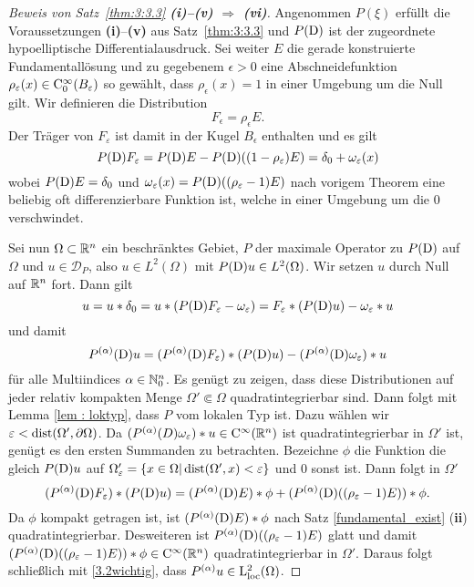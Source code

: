 \begin{proof}[Beweis von Satz~\ref{thm:3:3.3} {\bf (i)--(v) $\Longrightarrow$ (vi)}]
Angenommen $P(\xi)$ erfüllt die Voraussetzungen {\bf (i)}--{\bf(v)} aus Satz~\ref{thm:3:3.3} und $P(\mathrm D)$ ist der zugeordnete hypoelliptische Differentialausdruck. 
Sei weiter $E$ die gerade konstruierte Fundamentallösung und zu gegebenem $\epsilon>0$ eine Abschneidefunktion  $\rho_\varepsilon(x)\in \mathrm C_0^\infty(B_\varepsilon)$ so gewählt, dass $\rho_\epsilon(x)=1$ in einer Umgebung um die Null gilt. Wir definieren die Distribution
\begin{equation}
F_\epsilon= \rho_\epsilon E.
\end{equation}
Der Träger von $F_\varepsilon$ ist damit in der Kugel $B_{\epsilon}$ enthalten und es gilt
\begin{equation}
P(\mathrm D) F_\varepsilon= P(\mathrm D) E - P(\mathrm D)((1-\rho_\varepsilon)E) =\delta_0 + \omega_\varepsilon(x)
\end{equation}  
wobei $P(\mathrm D)E=\delta_0$ und $\omega_\varepsilon(x)= P(\mathrm D)((\rho_\varepsilon-1)E)$ nach vorigem Theorem eine beliebig oft differenzierbare Funktion ist, welche in einer Umgebung um die $0$ verschwindet.  

Sei nun $\Omega\subset\mathbb R^n$ ein beschränktes Gebiet, $P$ der maximale Operator zu $P(\mathrm D)$ auf $\Omega$ und $u\in \mathcal D_{P}$, also 
$u\in L^2(\Omega)$ mit $P(\mathrm D)u\in L^2(\Omega)$. Wir setzen $u$ durch Null auf $\mathbb R^n$ fort. Dann gilt 
\begin{equation}\label{3.2wichtig1}
u= u*\delta_0 = u * (P(\mathrm D) F_\varepsilon-\omega_\varepsilon) = F_\varepsilon*(P(\mathrm D)u)- \omega_\varepsilon *u
\end{equation}
und damit
\begin{equation}\label{3.2wichtig}
P^{(\alpha)}(\mathrm D) u = (P^{(\alpha)}(\mathrm D)F_\varepsilon)*(P(\mathrm D)u)-(P^{(\alpha)}(\mathrm D) \omega_\varepsilon)*u
\end{equation}
für alle Multiindices $\alpha\in\mathbb N_0^n$. Es genügt zu zeigen, dass diese Distributionen auf jeder relativ kompakten Menge $\Omega'\Subset\Omega$ quadratintegrierbar sind.  Dann folgt mit Lemma \ref{lem : loktyp}, dass $P$ vom lokalen Typ ist. Dazu wählen wir $\varepsilon<\operatorname{dist}(\Omega',\partial\Omega)$. Da
 $(P^{(\alpha)}(D)\omega_\varepsilon)*u\in \mathrm C^\infty(\mathbb R^n)$ ist  quadratintegrierbar in $\Omega'$ ist, genügt es den ersten Summanden zu betrachten. 
Bezeichne $\phi$ die Funktion die gleich $P(\mathrm D)u$ auf $\Omega'_\varepsilon=\{x\in \Omega| \operatorname{dist}(\Omega', x)<\varepsilon\}$ und $0$ sonst ist. Dann folgt in $\Omega'$
\begin{equation}
(P^{(\alpha)}(\mathrm D)F_\varepsilon)* (P(\mathrm D)u) = (P^{(\alpha)}(\mathrm D)E)*\phi+ (P^{(\alpha)}(\mathrm D)((\rho_\varepsilon-1)E))*\phi.
\end{equation}
Da $\phi$ kompakt getragen ist, ist $(P^{(\alpha)}(\mathrm D)E)*\phi$ nach Satz \ref{fundamental_exist} ({\bf ii}) quadratintegrierbar. Desweiteren ist $P^{(\alpha)}(\mathrm D)((\rho_\varepsilon-1)E)$ glatt und damit $(P^{(\alpha)}(\mathrm D)((\rho_\varepsilon-1)E))*\phi\in\mathrm C^\infty(\mathbb R^n)$ quadratintegrierbar in $\Omega'$. Daraus folgt schließlich mit \eqref{3.2wichtig}, dass $P^{(\alpha)}u\in \mathrm L^2_{\text{loc}}(\Omega)$.
\end{proof}


